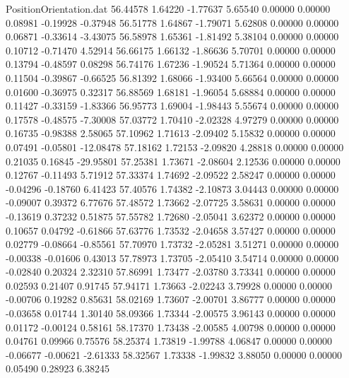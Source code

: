 \begin{filecontents}{PositionOrientation.dat}
  56.44578    1.64220   -1.77637     5.65540    0.00000    0.00000    0.08981   -0.19928   -0.37948
  56.51778    1.64867   -1.79071     5.62808    0.00000    0.00000    0.06871   -0.33614   -3.43075
  56.58978    1.65361   -1.81492     5.38104    0.00000    0.00000    0.10712   -0.71470    4.52914
  56.66175    1.66132   -1.86636     5.70701    0.00000    0.00000    0.13794   -0.48597    0.08298
  56.74176    1.67236   -1.90524     5.71364    0.00000    0.00000    0.11504   -0.39867   -0.66525
  56.81392    1.68066   -1.93400     5.66564    0.00000    0.00000    0.01600   -0.36975    0.32317
  56.88569    1.68181   -1.96054     5.68884    0.00000    0.00000    0.11427   -0.33159   -1.83366
  56.95773    1.69004   -1.98443     5.55674    0.00000    0.00000    0.17578   -0.48575   -7.30008
  57.03772    1.70410   -2.02328     4.97279    0.00000    0.00000    0.16735   -0.98388    2.58065
  57.10962    1.71613   -2.09402     5.15832    0.00000    0.00000    0.07491   -0.05801  -12.08478
  57.18162    1.72153   -2.09820     4.28818    0.00000    0.00000    0.21035    0.16845  -29.95801
  57.25381    1.73671   -2.08604     2.12536    0.00000    0.00000    0.12767   -0.11493    5.71912
  57.33374    1.74692   -2.09522     2.58247    0.00000    0.00000   -0.04296   -0.18760    6.41423
  57.40576    1.74382   -2.10873     3.04443    0.00000    0.00000   -0.09007    0.39372    6.77676
  57.48572    1.73662   -2.07725     3.58631    0.00000    0.00000   -0.13619    0.37232    0.51875
  57.55782    1.72680   -2.05041     3.62372    0.00000    0.00000    0.10657    0.04792   -0.61866
  57.63776    1.73532   -2.04658     3.57427    0.00000    0.00000    0.02779   -0.08664   -0.85561
  57.70970    1.73732   -2.05281     3.51271    0.00000    0.00000   -0.00338   -0.01606    0.43013
  57.78973    1.73705   -2.05410     3.54714    0.00000    0.00000   -0.02840    0.20324    2.32310
  57.86991    1.73477   -2.03780     3.73341    0.00000    0.00000    0.02593    0.21407    0.91745
  57.94171    1.73663   -2.02243     3.79928    0.00000    0.00000   -0.00706    0.19282    0.85631
  58.02169    1.73607   -2.00701     3.86777    0.00000    0.00000   -0.03658    0.01744    1.30140
  58.09366    1.73344   -2.00575     3.96143    0.00000    0.00000    0.01172   -0.00124    0.58161
  58.17370    1.73438   -2.00585     4.00798    0.00000    0.00000    0.04761    0.09966    0.75576
  58.25374    1.73819   -1.99788     4.06847    0.00000    0.00000   -0.06677   -0.00621   -2.61333
  58.32567    1.73338   -1.99832     3.88050    0.00000    0.00000    0.05490    0.28923    6.38245

\end{filecontents}
